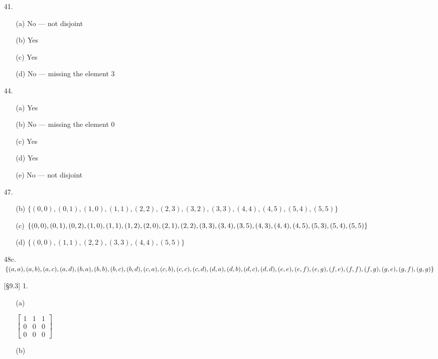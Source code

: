 \documentclass{article}
\begin{document}
\begin{enumerate}
    \item[41.]
        \begin{itemize}
            \item[(a)] No --- not disjoint
            \item[(b)] Yes
            \item[(c)] Yes
            \item[(d)] No --- missing the element $3$
        \end{itemize}
    \item[44.]
        \begin{itemize}
            \item[(a)] Yes
            \item[(b)] No --- missing the element $0$
            \item[(c)] Yes
            \item[(d)] Yes
            \item[(e)] No --- not disjoint
        \end{itemize}
    \item[47.]
        \begin{itemize}
            \item[(b)] $\{ (0,0), (0,1), (1,0), (1,1), (2,2), (2,3), (3,2), (3,3), (4,4), (4,5), (5,4), (5,5) \}$
            \item[(c)] $\{ (0,0), (0,1), (0,2), (1,0), (1,1), (1,2), (2,0), (2,1), (2,2), (3,3), (3,4), (3,5), (4,3), (4,4), \\ (4,5), (5,3), (5,4), (5,5) \}$
            \item[(d)] $\{ (0,0), (1,1), (2,2), (3,3), (4,4), (5,5) \}$
        \end{itemize}
    \item[48c.] $\{ (a,a), (a,b), (a,c), (a,d), (b,a), (b,b), (b,c), (b,d), (c,a), (c,b), (c,c), (c,d), (d,a), (d,b), (d,c), \\ (d,d), (e,e), (e,f), (e,g), (f,e), (f,f), (f,g), (g,e), (g,f), (g,g) \}$
    \item[{[\S 9.3]} 1.]
        \begin{itemize}
            \item[(a)] \hfill

            \vspace{-0.1in}
                $\begin{bmatrix}
                1 & 1 & 1 \\
                0 & 0 & 0 \\
                0 & 0 & 0
                \end{bmatrix}$
            \item[(b)] \hfill


\end{itemize}
\end{enumerate}
\end{document}
